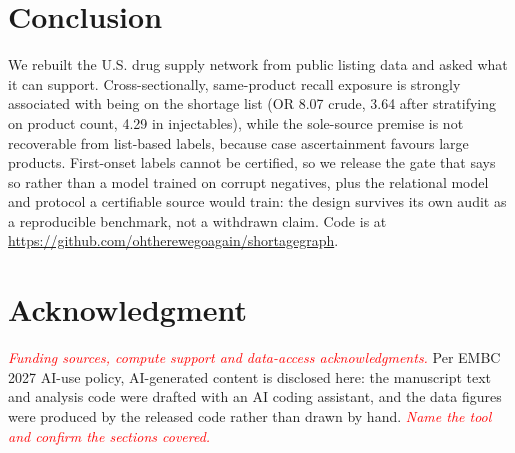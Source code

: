 \documentclass[conference,letterpaper]{IEEEtran}
\newcommand{\ph}[1]{\textcolor{red}{#1}}
\begin{document}
\section{Conclusion}

We rebuilt the U.S. drug supply network from public listing data and asked what
it can support. Cross-sectionally, same-product recall exposure is strongly
associated with being on the shortage list (OR 8.07 crude, 3.64 after
stratifying on product count, 4.29 in injectables), while the sole-source premise
is not recoverable from list-based labels, because case ascertainment favours
large products. First-onset labels cannot be certified, so we release the gate
that says so rather than a model trained on corrupt negatives, plus the relational
model and protocol a certifiable source would train: the design survives its own
audit as a reproducible benchmark, not a withdrawn claim. Code is at
\url{https://github.com/ohtherewegoagain/shortagegraph}.

\clearpage

\section*{Acknowledgment}

\emph{\ph{Funding sources, compute support and data-access acknowledgments.}}
Per EMBC 2027 AI-use policy, AI-generated content is disclosed here: the
manuscript text and analysis code were drafted with an AI coding assistant, and
the data figures were produced by the released code rather than drawn by hand.
\emph{\ph{Name the tool and confirm the sections covered.}}
\end{document}
